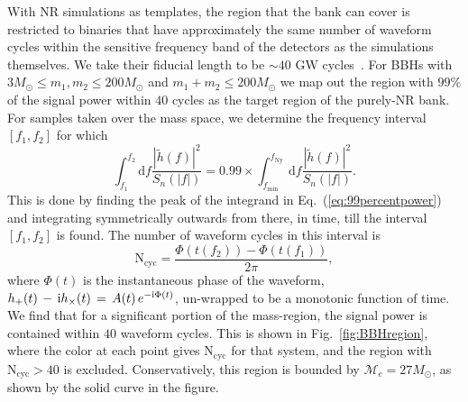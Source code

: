 \documentclass[aps,
prd,
twocolumn,
superscriptaddress,
lengthcheck,showpacs,letterpaper,nofootinbib,
floatfix]{revtex4-1}
\newcommand{\ii}{{\rm i}}
\newcommand{\D}{\mathrm{d}}
\newcommand{\N}{\mathrm{N}}
\newcommand{\cyc}{\mathrm{cyc}}
\newcommand{\red}{\textcolor{red}}
\begin{document}
With NR simulations as templates, the region that the bank can cover is 
restricted to binaries that have approximately the same number of waveform 
cycles within the sensitive frequency band of the detectors as the simulations
themselves. We take their fiducial length to be $\sim 40$ GW
cycles~\cite{40GWcycles}. For BBHs with 
$3M_{\odot}\leq m_1,m_2\leq 200M_{\odot}$ and $m_1+m_2\leq 200M_{\odot}$ 
we map out the region with $99\%$ of the signal power within $40$ cycles as the
target region of the purely-NR bank. For samples taken over the mass space, we
determine the frequency interval $[f_1,f_2]$ for which
\begin{equation}\label{eq:99percentpower}
 \int_{f_1}^{f_2}\D f \dfrac{|\tilde{h}(f)|^2}{S_n(|f|)} = 
0.99\times\int_{f_\mathrm{min}}^{f_\mathrm{Ny}}\D f \dfrac{|\tilde{h}(f)|^2}{S_n(|f|)}.
\end{equation}
This is done by finding the peak of the integrand in 
Eq.~(\ref{eq:99percentpower}) and integrating symmetrically outwards from 
there, in time, till the interval $[f_1,f_2]$ is found. The number 
of waveform cycles in this interval is
\begin{equation}
 \N_{\cyc} = \dfrac{\Phi( t(f_2) ) - \Phi( t(f_1) )}{2\pi},
\end{equation}
where $\Phi(t)$ is the instantaneous phase of the waveform, 
${h_+(t)\,-\,\ii h_{\times}(t)\,=\,A(t)\,e^{-\ii \Phi(t)}}$, un-wrapped to be a
monotonic function of time. 
We find that for a significant portion of the mass-region, the signal power 
is contained within $40$ waveform cycles. This is shown in 
Fig.~\ref{fig:BBHregion}, where the color at each point gives $\N_{\cyc}$ for
that system, and the region with $\N_{\cyc}> 40$ is excluded. Conservatively, 
this region is bounded by $\mathcal{M}_c = 27M_\odot$, as shown by the solid 
curve in the figure.
\end{document}
